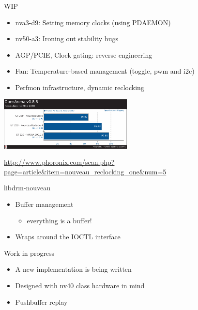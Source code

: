 \documentclass[11pt,english,compress]{beamer}
\begin{document}
		\begin{frame}
			\begin{block}{WIP}
				\begin{itemize}
					\item nva3-d9: Setting memory clocks (using PDAEMON)
					\item nv50-a3: Ironing out stability bugs 
					\item AGP/PCIE, Clock gating: reverse engineering
					\item Fan: Temperature-based management (toggle, pwm and i2c)
					\item Perfmon infrastructure, dynamic reclocking
				\end{itemize}
			\end{block}

			\begin{center}
				\includegraphics[height=2.7cm]{imgs/gt220_openarena_bench.pdf}
			\end{center}
			\begin{center}
				\url{http://www.phoronix.com/scan.php?page=article&item=nouveau_reclocking_one&num=5}
			\end{center}

		\end{frame}

		\begin{frame}
			\begin{block}{libdrm-nouveau}
				\begin{itemize}
					\item Buffer management
						\begin{itemize}
							\item everything is a buffer!
						\end{itemize}
					\item Wraps around the IOCTL interface
				\end{itemize}
			\end{block}
			\begin{block}{Work in progress}
				\begin{itemize}
					\item A new implementation is being written
					\item Designed with nv40 class hardware in mind
					\item Pushbuffer replay
				\end{itemize}
			\end{block}
		\end{frame}
\end{document}
